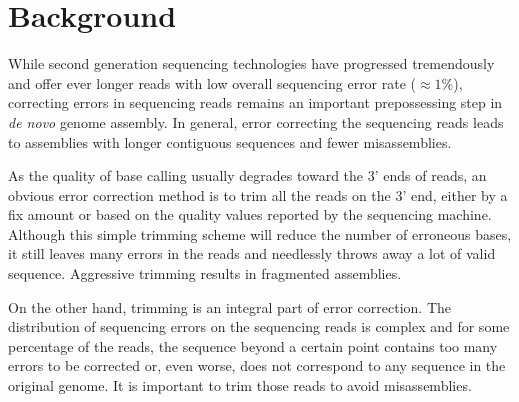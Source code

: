 \documentclass[10pt]{bmc_article}
\newenvironment{bmcformat}{\fussy\setboolean{publ}{true}}{\fussy}
\begin{document}
\begin{bmcformat}




\section*{Background}
\cite{blank}
While second generation sequencing technologies have progressed tremendously and offer ever longer reads with low overall sequencing error rate ($\approx 1\%$), correcting errors in sequencing reads remains an important prepossessing step in \emph{de novo} genome assembly.
In general, error correcting the sequencing reads leads to assemblies with longer contiguous sequences and fewer misassemblies.

As the quality of base calling usually degrades toward the 3' ends of reads, an obvious error correction method is to trim all the reads on the 3' end, either by a fix amount or based on the quality values reported by the sequencing machine.
Although this simple trimming scheme will reduce the number of erroneous bases, it still leaves many errors in the reads and needlessly throws away a lot of valid sequence.
Aggressive trimming results in fragmented assemblies.

On the other hand, trimming is an integral part of error correction.
The distribution of sequencing errors on the sequencing reads is complex and for some percentage of the reads, the sequence beyond a certain point contains too many errors to be corrected or, even worse, does not correspond to any sequence in the original genome.
It is important to trim those reads to avoid misassemblies.


\end{bmcformat}
\end{document}
